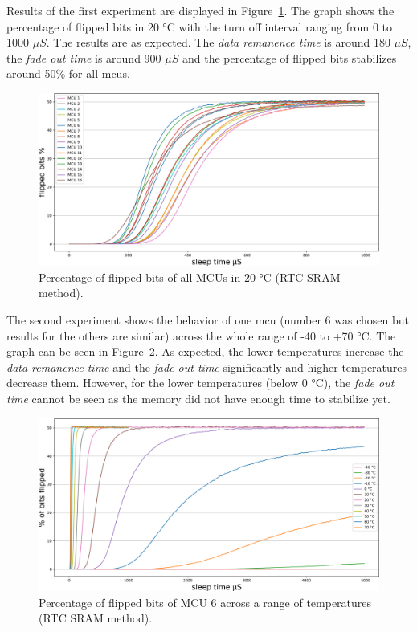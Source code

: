 Results of the first experiment are displayed in Figure~\ref{fig:all_plus_20_rtc}. The graph shows the percentage of flipped bits in 20 °C with the turn off interval ranging from 0 to 1000 $\mu{}S$. The results are as expected. The \emph{data remanence time} is around 180 $\mu{}S$, the \emph{fade out time} is around 900 $\mu{}S$ and the percentage of flipped bits stabilizes around 50\% for all \glspl{mcu}.

\begin{figure}[ht!]
    \centering
    \captionsetup{justification=centering,margin=0.5cm}
    \includegraphics[width=\textwidth]{images/all_plus_20_rtc.png}
    \caption{Percentage of flipped bits of all MCUs in 20 °C (RTC SRAM method).}
    \label{fig:all_plus_20_rtc}
\end{figure}


The second experiment shows the behavior of one \gls{mcu} (number 6 was chosen but results for the others are similar) across the whole range of -40 to +70 °C. The graph can be seen in Figure~\ref{fig:6_across_temps_rtc}. As expected, the lower temperatures increase the \emph{data remanence time} and the \emph{fade out time} significantly and higher temperatures decrease them. However, for the lower temperatures (below 0 °C), the \emph{fade out time} cannot be seen as the memory did not have enough time to stabilize yet. 

\begin{figure}[ht!]
    \centering
    \captionsetup{justification=centering,margin=0.5cm}
    \includegraphics[width=\textwidth]{images/6_across_temps_rtc.png}
    \caption{Percentage of flipped bits of MCU 6 across a range of temperatures (RTC SRAM method).}
    \label{fig:6_across_temps_rtc}
\end{figure}

